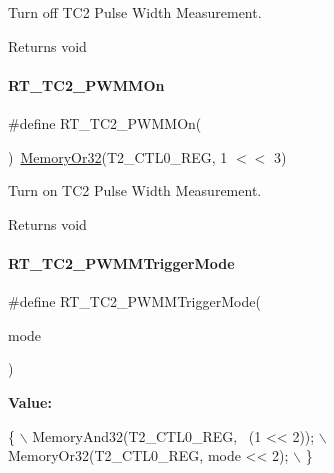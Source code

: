 Turn off T\+C2 Pulse Width Measurement. 

\begin{DoxyReturn}{Returns}
void 
\end{DoxyReturn}
\mbox{\label{a00047_a37ffb0b466d2a13bb9917a818b06776b}} 
\paragraph{\texorpdfstring{R\+T\+\_\+\+T\+C2\+\_\+\+P\+W\+M\+M\+On}{RT\_TC2\_PWMMOn}}
{\footnotesize\ttfamily \#define R\+T\+\_\+\+T\+C2\+\_\+\+P\+W\+M\+M\+On(\begin{DoxyParamCaption}{ }\end{DoxyParamCaption})~\mbox{\hyperlink{a00020_a9ea92ebccdef6bdaca4d00210cc7266d}{Memory\+Or32}}(T2\+\_\+\+C\+T\+L0\+\_\+\+R\+EG, 1 $<$$<$ 3)}



Turn on T\+C2 Pulse Width Measurement. 

\begin{DoxyReturn}{Returns}
void 
\end{DoxyReturn}
\mbox{\label{a00047_a80f5ade258504a1243ccb058dd860475}} 
\paragraph{\texorpdfstring{R\+T\+\_\+\+T\+C2\+\_\+\+P\+W\+M\+M\+Trigger\+Mode}{RT\_TC2\_PWMMTriggerMode}}
{\footnotesize\ttfamily \#define R\+T\+\_\+\+T\+C2\+\_\+\+P\+W\+M\+M\+Trigger\+Mode(\begin{DoxyParamCaption}\item[{}]{mode }\end{DoxyParamCaption})}

{\bfseries Value\+:}
\begin{DoxyCode}
\{                                        \(\backslash\)
        MemoryAnd32(T2\_CTL0\_REG, ~(1 << 2)); \(\backslash\)
        MemoryOr32(T2\_CTL0\_REG, mode << 2);  \(\backslash\)
    \}
\end{DoxyCode}


